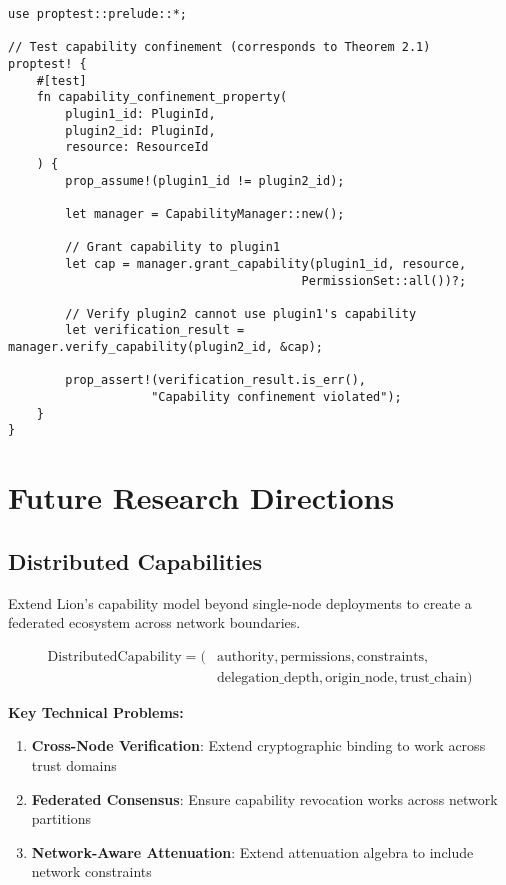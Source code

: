 \begin{lstlisting}[style=rust,caption={Property-Based Testing}]
use proptest::prelude::*;

// Test capability confinement (corresponds to Theorem 2.1)
proptest! {
    #[test]
    fn capability_confinement_property(
        plugin1_id: PluginId,
        plugin2_id: PluginId,
        resource: ResourceId
    ) {
        prop_assume!(plugin1_id != plugin2_id);
        
        let manager = CapabilityManager::new();
        
        // Grant capability to plugin1
        let cap = manager.grant_capability(plugin1_id, resource, 
                                         PermissionSet::all())?;
        
        // Verify plugin2 cannot use plugin1's capability
        let verification_result = manager.verify_capability(plugin2_id, &cap);
        
        prop_assert!(verification_result.is_err(), 
                    "Capability confinement violated");
    }
}
\end{lstlisting}

\newpage

\section{Future Research Directions}

\subsection{Distributed Capabilities}

Extend Lion's capability model beyond single-node deployments to create a federated ecosystem across network boundaries.

\begin{definition}
\begin{align}
\text{DistributedCapability} = (&\text{authority}, \text{permissions}, \text{constraints}, \\
&\text{delegation\_depth}, \text{origin\_node}, \text{trust\_chain})
\end{align}
\end{definition}

\textbf{Key Technical Problems:}
\begin{enumerate}
\item \textbf{Cross-Node Verification}: Extend cryptographic binding to work across trust domains
\item \textbf{Federated Consensus}: Ensure capability revocation works across network partitions
\item \textbf{Network-Aware Attenuation}: Extend attenuation algebra to include network constraints
\end{enumerate}

